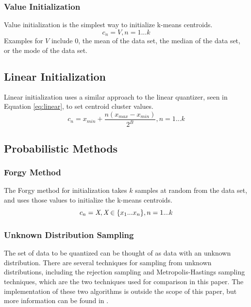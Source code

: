 \documentclass[journal]{IEEEtran}
\begin{document}
\subsubsection{Value Initialization}
Value initialization is the simplest way to initialize k-means centroids.
\begin{equation}
    c_n = V, n = 1...k
\end{equation}
Examples for $V$ include $0$, the mean of the data set, the median of the data set, or the mode of the data set.

\subsection{Linear Initialization}
Linear initialization uses a similar approach to the linear quantizer, seen in Equation \ref{eq:linear}, to set centroid cluster values.
\begin{equation}
    c_n = x_{min} + \frac{n(x_{max} - x_{min})}{2^B}, n = 1...k 
\end{equation}

\subsection{Probabilistic Methods}
\subsubsection{Forgy Method}
The Forgy method for initialization takes $k$ samples at random from the data set, and uses those values to initialize the k-means centroids.
\begin{equation}
    c_n = \emph{X}, \emph{X} \in \{x_1...x_n\}, n = 1...k
\end{equation}

\subsubsection{Unknown Distribution Sampling}
The set of data to be quantized can be thought of as data with an unknown distribution. There are several techniques for sampling from unknown
distributions, including the rejection sampling and Metropolis-Hastings sampling techniques, which are the two techniques used for comparison in this
paper. The implementation of these two algorithms is outside the scope of this paper, but more information can be found in \cite{BayesianBook}.
\end{document}
